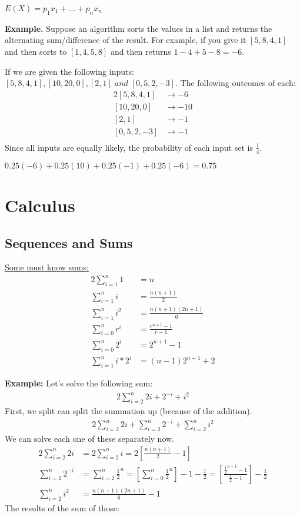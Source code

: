\documentclass{article}
\begin{document}
\begin{center}
  $E(X) = p_1x_1 + ... + p_nx_n $
\end{center}

\textbf{Example.} Suppose an algorithm sorts the values in a list and returns the alternating sum/difference 
of the result. For example, if you give it $[5,8,4,1]$ and then sorts to $[1,4,5,8]$ and then returns $1-4+5-8=-6$.

If we are given the following inputs: $[5, 8, 4, 1], [10, 20, 0], [2, 1]\;and\;[0, 5, 2, -3]$.
The following outcomes of each: 
\begin{alignat*}{2}
  [5,8,4,1] &\rightarrow -6\\
  [10,20,0] &\rightarrow -10\\
  [2,1] &\rightarrow -1\\
  [0,5,2,-3] &\rightarrow -1\\
\end{alignat*}
Since all inputs are equally likely, the probability of each input set is $\frac{1}{4}$.
\begin{center}
$0.25(-6) + 0.25(10) + 0.25(-1) + 0.25(-6) = 0.75$
\end{center}
\section{Calculus}
\subsection{Sequences and Sums}
\underline{Some must know sums:}
\begin{alignat*}{2}
  \sum_{i=1}^n 1 &= n \\
  \sum_{i=1}^n i &= \frac{n(n+1)}{2}\\
  \sum_{i=1}^n i^2 &= \frac{n(n+1)(2n+1)}{6}\\
  \sum_{i=0}^n r^i &= \frac{r^{n+1} - 1}{r-1} \\ 
  \sum_{i=0}^n 2^i &= 2^{n+1} - 1\\
  \sum_{i=1}^n i*2^i &= (n-1)2^{n+1} + 2
\end{alignat*}

\textbf{Example:} Let's solve the following sum:
\begin{alignat*}{2}
  \sum_{i=2}^n 2i + 2^{-i}+i^2
\end{alignat*}
First, we split can split the summation up (because of the addition).
\begin{alignat*}{2}
  \sum_{i=2}^n 2i + \sum_{i=2}^n2^{-i} + \sum_{i=2}^ni^2
\end{alignat*}
We can solve each one of these separately now.
\begin{alignat*}{2}
  \sum_{i=2}^n 2i &= 2\sum_{i=2}^n i = 2 \left[\frac{n(n+1)}{2} - 1\right] \\
  \sum_{i=2}^n 2^{-i} &= \sum_{i=2}^n \frac{1}{2}^n = \left[\sum_{i=0}^n \frac{1}{2}^n \right] - 1 
  - \frac{1}{2} = \left[\frac{\frac{1}{2}^{n+1} - 1}{\frac{1}{2}-1}\right] - \frac{1}{2} \\
  \sum_{i=2}^n i^2 &= \frac{n(n+1)(2n+1)}{6} - 1
\end{alignat*}
The results of the sum of those:
\end{document}
